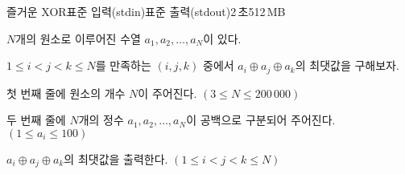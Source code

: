 \begin{problem}{즐거운 XOR}{표준 입력(stdin)}{표준 출력(stdout)}{2\,초}{512\,MB}

$N$개의 원소로 이루어진 수열 $a_1, a_2, \dots , a_N$이 있다.

$1 \le i < j < k \le N$를 만족하는 $(i, j, k)$ 중에서 $a_i \oplus a_j \oplus a_k$의 최댓값을 구해보자.

\InputFile
첫 번째 줄에 원소의 개수 $N$이 주어진다. $(3 \le N \le 200\,000)$

두 번째 줄에 $N$개의 정수 $a_1, a_2, \dots, a_N$이 공백으로 구분되어 주어진다. $(1 \le a_i \le 100)$

\OutputFile
$a_i \oplus a_j \oplus a_k$의 최댓값을 출력한다. $(1 \le i < j < k \le N)$

\Examples

\begin{example}
%
%
\end{example}

\end{problem}
